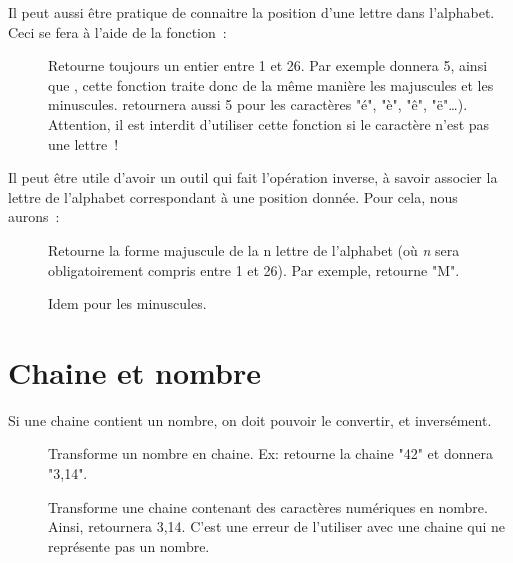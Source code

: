 	Il peut aussi être pratique de connaitre 
	la position d’une lettre dans l’alphabet. 
	Ceci se fera à l’aide de la fonction~:

	\begin{description}
	\item[]
		Retourne toujours un entier entre 1 et 26. 
		Par exemple  donnera 5, 
		ainsi que , 
		cette fonction traite donc de la même manière 
		les majuscules et les minuscules. 
		 retournera aussi 5 pour les caractères "é", "è", "ê", "ë"\dots). 
		Attention, il est interdit d’utiliser cette fonction 
		si le caractère n’est pas une lettre~!
	\end{description}
	
	Il peut être utile d’avoir un outil qui fait l’opération inverse, 
	à savoir associer la lettre de l’alphabet correspondant à une position donnée. 
	Pour cela, nous aurons~: 

	\begin{description}
	\item[]
		Retourne la forme majuscule de la n\ieme{} lettre de l’alphabet 
		(où \textit{n} sera obligatoirement compris entre 1 et 26). 
		Par exemple,  retourne "M".
	\item[]
		Idem pour les minuscules.
	\end{description}
	
\section{Chaine et nombre}

	Si une chaine contient un nombre,
	on doit pouvoir le convertir, et inversément.

	\begin{description}
	\item[]
		Transforme un nombre en chaine.
		Ex:  retourne la chaine "42"
		et  donnera "3,14". 
	\item[]
		Transforme une chaine contenant des caractères numériques 
		en nombre.
		Ainsi,  retournera 3,14. 
		C’est une erreur de l’utiliser avec une chaine
		qui ne représente pas un nombre.
	\end{description}
	
